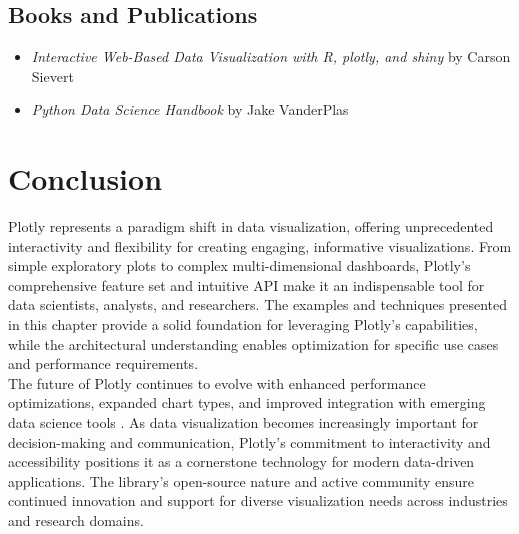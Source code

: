 \subsection{Books and Publications}
\begin{itemize}
	\item \textit{Interactive Web-Based Data Visualization with R, plotly, and shiny} by Carson Sievert \cite{Sievert:2020}
	\item \textit{Python Data Science Handbook} by Jake VanderPlas \cite{McKinney:2023}
\end{itemize}

\section{Conclusion}
\label{sec:conclusion}

Plotly represents a paradigm shift in data visualization, offering unprecedented interactivity and flexibility for creating engaging, informative visualizations. From simple exploratory plots to complex multi-dimensional dashboards, Plotly's comprehensive feature set and intuitive API make it an indispensable tool for data scientists, analysts, and researchers. The examples and techniques presented in this chapter provide a solid foundation for leveraging Plotly's capabilities, while the architectural understanding enables optimization for specific use cases and performance requirements.\\

The future of Plotly continues to evolve with enhanced performance optimizations, expanded chart types, and improved integration with emerging data science tools \cite{Plotly:2024}. As data visualization becomes increasingly important for decision-making and communication, Plotly's commitment to interactivity and accessibility positions it as a cornerstone technology for modern data-driven applications. The library's open-source nature and active community ensure continued innovation and support for diverse visualization needs across industries and research domains.